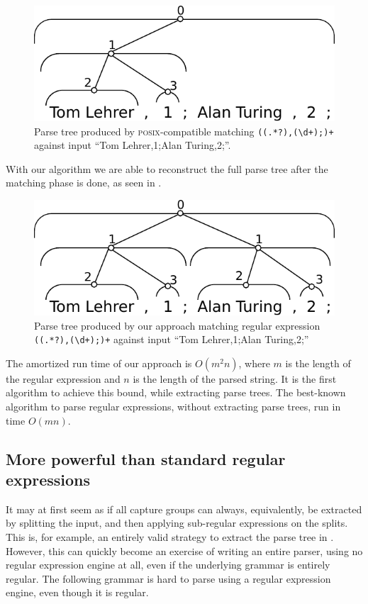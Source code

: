 \documentclass[english]{sigplanconf}
\theoremstyle{definition}
\begin{document}
\begin{figure}[h]
\centering
\includegraphics[width=.75\linewidth]{graphs/posix_parse}
\caption{ Parse tree produced by \textsc{posix}-compatible matching \texttt{((.*?),(\textbackslash d+);)+} against input ``Tom
Lehrer,1;Alan Turing,2;''.}
\end{figure}

With our algorithm we are able to reconstruct the full parse
tree after the matching phase is done, as seen in .

\begin{figure}[h]
\centering
\includegraphics[width=.75\linewidth]{graphs/full_parse}
\caption{ Parse tree produced by our approach matching regular expression \texttt{((.*?),(\textbackslash d+);)+} against input ``Tom
Lehrer,1;Alan Turing,2;''}
\end{figure}

The amortized run time of our approach is $O(m^2n)$, where $m$ is
the length of the regular expression and $n$ is the length of the
parsed string. It is the first algorithm to achieve this bound,
while extracting parse trees. The best-known algorithm to parse
regular expressions, without extracting parse trees, run in time
$O(m n)$\cite{Sedg90a}.

\subsection{More powerful than standard regular expressions}
It may at first seem as if all capture groups can always, equivalently,
be extracted by splitting the input, and then applying sub-regular
expressions on the splits.  This is, for example, an entirely valid
strategy to extract the parse tree in .  However,
this can quickly become an exercise of writing an entire parser,
using no regular expression engine at all, even if the underlying
grammar is entirely regular.  The following grammar is hard to parse
using a regular expression engine, even though it is regular.
\end{document}
